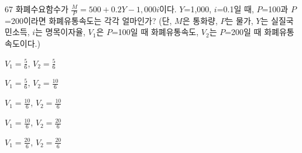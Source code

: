 \begin{question}{67}
화폐수요함수가 $\frac{ M } { P } =500+0.2Y-1,000i$이다. $Y$=1,000, $i$=0.1일 때, $P$=100과 $P$=200이라면 화폐유통속도는 각각 얼마인가? (단, $M$은 통화량, $P$는 물가, $Y$는 실질국민소득, $i$는 명목이자율, $V_{ 1 }$은 $P$=100일 때 화폐유통속도, $V_{ 2 }$는 $P$=200일 때 화폐유통속도이다.)
\begin{choices}
  \item $V_{ 1 } = \frac{ 5 } { 6 }$, $V_{ 2 } = \frac{ 5 } { 6 }$
  \item $V_{ 1 } = \frac{ 5 } { 6 }$, $V_{ 2 } = \frac{ 10 } { 6 }$
  \item $V_{ 1 } = \frac{ 10 } { 6 }$, $V_{ 2 } = \frac{ 10 } { 6 }$
  \item $V_{ 1 } = \frac{ 10 } { 6 }$, $V_{ 2 } = \frac{ 20 } { 6 }$
  \item $V_{ 1 } = \frac{ 20 } { 6 }$, $V_{ 2 } = \frac{ 20 } { 6 }$
\end{choices}
\end{question}
